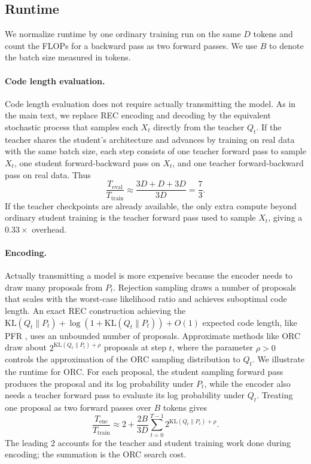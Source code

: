 \documentclass{article}
\theoremstyle{plain}
\theoremstyle{definition}
\theoremstyle{remark}
\begin{document}
\subsection{Runtime}
We normalize runtime by one ordinary training run on the same $D$ tokens and count the FLOPs for a backward pass as two forward passes. We use $B$ to denote the batch size measured in tokens.
\paragraph{Code length evaluation.}
Code length evaluation does not require actually transmitting the model. As in the main text, we replace REC encoding and decoding by the equivalent stochastic process that samples each $X_t$ directly from the teacher $Q_t$. If the teacher shares the student's architecture and advances by training on real data with the same batch size, each step consists of one teacher forward pass to sample $X_t$, one student forward-backward pass on $X_t$, and one teacher forward-backward pass on real data. Thus
\begin{equation}
\frac{T_{\mathrm{eval}}}{T_{\mathrm{train}}}
\approx
\frac{3D+D+3D}{3D}
=
\frac{7}{3}.
\end{equation}
If the teacher checkpoints are already available, the only extra compute beyond ordinary student training is the teacher forward pass used to sample $X_t$, giving a $0.33\times$ overhead.

\paragraph{Encoding.} Actually transmitting a model is more expensive because the encoder needs to draw many proposals from $P_t$. Rejection sampling draws a number of proposals that scales with the worst-case likelihood ratio and achieves suboptimal code length. An exact REC construction achieving the $\mathrm{KL}(Q_t\|P_t) + \log(1+\mathrm{KL}(Q_t\|P_t)) + O(1)$ expected code length, like PFR \citep{li2018strong}, uses an unbounded number of proposals. Approximate methods like ORC draw about $2^{\mathrm{KL}(Q_t\|P_t) + \rho}$ proposals at step $t$, where the parameter $\rho>0$ controls the approximation of the ORC sampling distribution to $Q_t$. We illustrate the runtime for ORC. For each proposal, the student sampling forward pass produces the proposal and its log probability under $P_t$, while the encoder also needs a teacher forward pass to evaluate its log probability under $Q_t$. Treating one proposal as two forward passes over $B$ tokens gives
\begin{equation}
\frac{T_{\mathrm{enc}}}{T_{\mathrm{train}}}
\approx
2+
\frac{2B}{3D}
\sum_{t=0}^{T-1}
2^{\mathrm{KL}(Q_t\|P_t)+\rho}.
\end{equation}
The leading $2$ accounts for the teacher and student training work done during encoding; the summation is the ORC search cost. 
\end{document}
